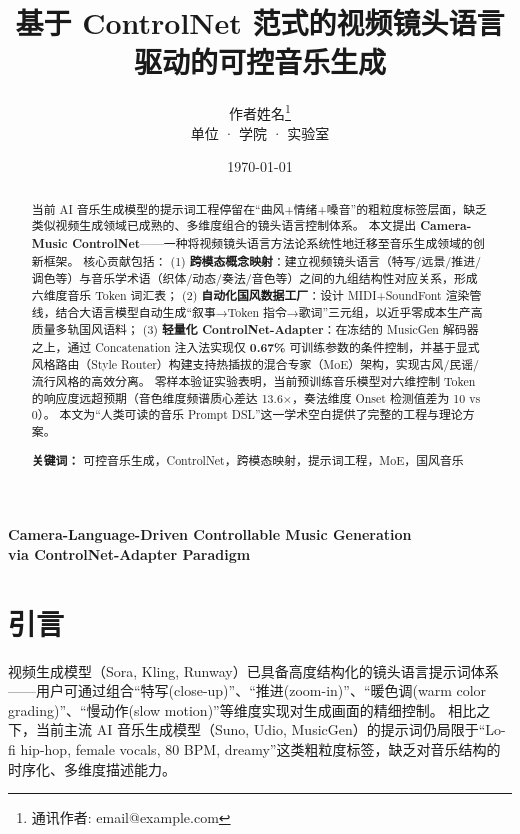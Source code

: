 \documentclass[12pt,a4paper]{article}
\title{\bfseries 基于 ControlNet 范式的视频镜头语言驱动的可控音乐生成}
\author{作者姓名\thanks{通讯作者: email@example.com} \\
{\small 单位 · 学院 · 实验室}}
\date{\today}
\begin{document}
\maketitle

\begin{center}
\large\textbf{Camera-Language-Driven Controllable Music Generation\\ via ControlNet-Adapter Paradigm}
\end{center}

\begin{abstract}
\noindent
当前 AI 音乐生成模型的提示词工程停留在“曲风+情绪+嗓音”的粗粒度标签层面，缺乏类似视频生成领域已成熟的、多维度组合的镜头语言控制体系。
本文提出 \textbf{Camera-Music ControlNet}——一种将视频镜头语言方法论系统性地迁移至音乐生成领域的创新框架。
核心贡献包括：
(1) \textbf{跨模态概念映射}：建立视频镜头语言（特写/远景/推进/调色等）与音乐学术语（织体/动态/奏法/音色等）之间的九组结构性对应关系，形成六维度音乐 Token 词汇表；
(2) \textbf{自动化国风数据工厂}：设计 MIDI+SoundFont 渲染管线，结合大语言模型自动生成“叙事→Token 指令→歌词”三元组，以近乎零成本生产高质量多轨国风语料；
(3) \textbf{轻量化 ControlNet-Adapter}：在冻结的 MusicGen 解码器之上，通过 Concatenation 注入法实现仅 \textbf{0.67\%} 可训练参数的条件控制，并基于显式风格路由（Style Router）构建支持热插拔的混合专家（MoE）架构，实现古风/民谣/流行风格的高效分离。
零样本验证实验表明，当前预训练音乐模型对六维控制 Token 的响应度远超预期（音色维度频谱质心差达 13.6$\times$，奏法维度 Onset 检测值差为 10 vs 0）。
本文为“人类可读的音乐 Prompt DSL”这一学术空白提供了完整的工程与理论方案。

\vspace{6pt}
\noindent\textbf{关键词：} 可控音乐生成，ControlNet，跨模态映射，提示词工程，MoE，国风音乐
\end{abstract}

\section{引言}

视频生成模型（Sora, Kling, Runway）已具备高度结构化的镜头语言提示词体系——用户可通过组合“特写(close-up)”、“推进(zoom-in)”、“暖色调(warm color grading)”、“慢动作(slow motion)”等维度实现对生成画面的精细控制。
相比之下，当前主流 AI 音乐生成模型（Suno, Udio, MusicGen）的提示词仍局限于“Lo-fi hip-hop, female vocals, 80 BPM, dreamy”这类粗粒度标签，缺乏对音乐结构的时序化、多维度描述能力。
\end{document}
